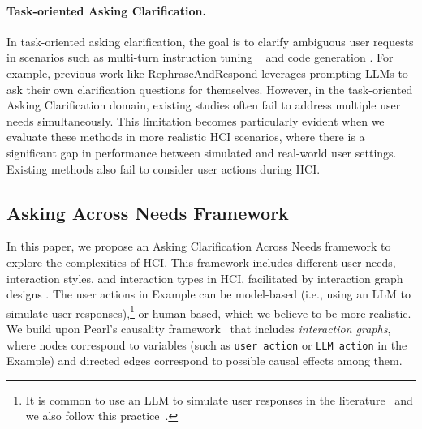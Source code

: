 \documentclass{article} %
\theoremstyle{definition}
\begin{document}
\paragraph{Task-oriented Asking Clarification.}
In task-oriented asking clarification, the goal is to clarify ambiguous user requests in scenarios such as multi-turn instruction tuning ~\citep{proactive_cot} and code generation \citep{clarifygpt}.
For example, previous work like RephraseAndRespond leverages prompting LLMs to ask their own clarification questions for themselves.
However, in the task-oriented Asking Clarification domain, existing studies often fail to address multiple user needs simultaneously. This limitation becomes particularly evident when we evaluate these methods in more realistic HCI scenarios, where there is a significant gap in performance between simulated and real-world user settings. Existing methods also fail to consider user actions during HCI.


\subsection{Asking Across Needs Framework}
\label{sec:method}
In this paper, we propose an Asking Clarification Across Needs framework to explore the complexities of HCI.
This framework includes different user needs, interaction styles, and interaction types in HCI, facilitated by interaction graph designs . The user actions in Example can be model-based (i.e., using an LLM to simulate user responses),\footnote{It is common to use an LLM to simulate user responses in the literature~\citep{ShiQWY19,TsengDKB20,abs-2311-05584,HuFLHL23} and we also follow this practice~\citep{simulate1000}.} or human-based, which we believe to be more realistic.
We build upon Pearl's causality framework~\citep{Pearl09a,pearl2016causal} that includes \textit{interaction graphs}, where nodes correspond to variables (such as \texttt{user action} or \texttt{LLM action} in the Example) and directed edges correspond to possible causal effects among them.

\end{document}
